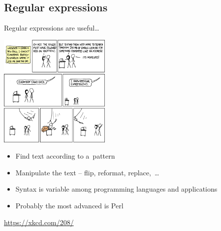 \documentclass[compress, ucs, xelatex, 11pt, xcolor=svgnames,
  hyperref={
    bookmarks=true,
    unicode=true,
    colorlinks=true,
    pdftitle={Linux, command line and MetaCentrum},
    plainpages=false,
    pdfauthor={Vojtech Zeisek},
    pdfsubject={Course about use of Linux command line, writing shell scripts and using MetaCentrum of CESNET},
    pdfcreator={XeLaTeX},
    pdfkeywords={Linux, GNU, BASH, shell, command line, MetaCentrum},
    linkcolor=DarkRed,
    anchorcolor=DarkBlue,
    citecolor=Indigo,
    filecolor=NavyBlue,
    menucolor=DarkMagenta,
    urlcolor=DarkBlue,
    pdftex},
  url={hyphens, lowtilde} %
  ]{beamer}
\begin{document}
\subsection{Regular expressions}

\begin{frame}{Regular expressions are useful\ldots}
  \begin{multicols}{2}
    \begin{center}
      \includegraphics[height=5.5cm]{regular_expressions.png}
    \end{center}
    \columnbreak
    \begin{itemize}
      \item Find text according to a~pattern
      \item Manipulate the text -- flip, reformat, replace,~\ldots
      \item Syntax is variable among programming languages and applications
      \item Probably the most advanced is Perl
    \end{itemize}
    \vfill
    \url{https://xkcd.com/208/}
  \end{multicols}
\end{frame}
\end{document}
